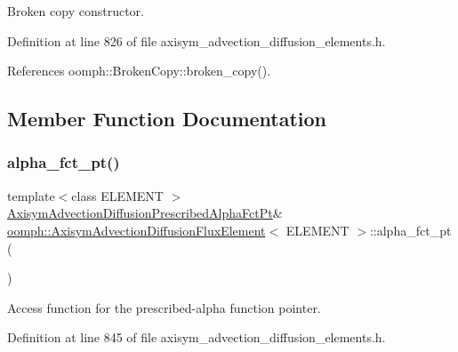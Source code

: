 Broken copy constructor. 



Definition at line 826 of file axisym\+\_\+advection\+\_\+diffusion\+\_\+elements.\+h.



References oomph\+::\+Broken\+Copy\+::broken\+\_\+copy().



\subsection{Member Function Documentation}
\mbox{\label{classoomph_1_1AxisymAdvectionDiffusionFluxElement_a6e19586f128e5a8be0c5592147a49938}} 
\subsubsection{\texorpdfstring{alpha\+\_\+fct\+\_\+pt()}{alpha\_fct\_pt()}}
{\footnotesize\ttfamily template$<$class E\+L\+E\+M\+E\+NT $>$ \\
\hyperlink{classoomph_1_1AxisymAdvectionDiffusionFluxElement_aa0922f19043ccc259c61c704fa3b5767}{Axisym\+Advection\+Diffusion\+Prescribed\+Alpha\+Fct\+Pt}\& \hyperlink{classoomph_1_1AxisymAdvectionDiffusionFluxElement}{oomph\+::\+Axisym\+Advection\+Diffusion\+Flux\+Element}$<$ E\+L\+E\+M\+E\+NT $>$\+::alpha\+\_\+fct\+\_\+pt (\begin{DoxyParamCaption}{ }\end{DoxyParamCaption})\hspace{0.3cm}{\ttfamily [inline]}}



Access function for the prescribed-\/alpha function pointer. 



Definition at line 845 of file axisym\+\_\+advection\+\_\+diffusion\+\_\+elements.\+h.

\mbox{\label{classoomph_1_1AxisymAdvectionDiffusionFluxElement_a3f81fc1578f2cec5a54a8a5671610dbb}} 
